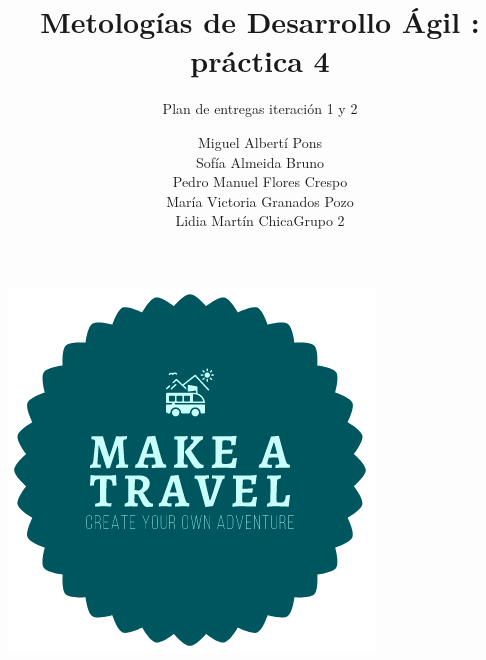 \documentclass[spanish]{beamer}
\title{Metologías de Desarrollo Ágil : práctica 4}
\subtitle{Plan de entregas iteración 1 y 2}
\author{Miguel Albertí Pons\\ Sofía Almeida Bruno\\ Pedro Manuel Flores Crespo\\ María Victoria Granados Pozo\\ Lidia Martín Chica\vspace{1em}Grupo 2}
\begin{document}
\maketitle

\begin{frame}
\centering
\begin{center}
		\includegraphics[scale=0.4]{../../Imagenes/Logo}
	\end{center}
\end{frame}
\end{document}
